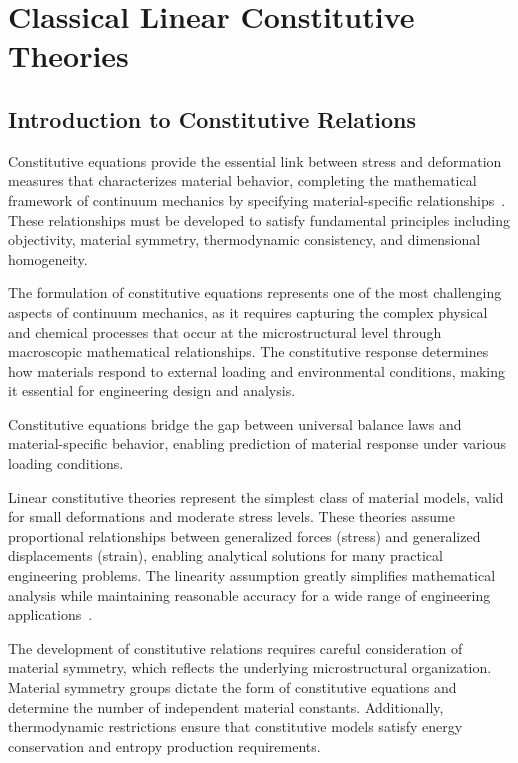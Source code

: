 \chapter{Classical Linear Constitutive Theories}

\section{Introduction to Constitutive Relations}

Constitutive equations provide the essential link between stress and deformation measures that characterizes material behavior, completing the mathematical framework of continuum mechanics by specifying material-specific relationships~\autocite{Sadd.2019}. These relationships must be developed to satisfy fundamental principles including objectivity, material symmetry, thermodynamic consistency, and dimensional homogeneity.

The formulation of constitutive equations represents one of the most challenging aspects of continuum mechanics, as it requires capturing the complex physical and chemical processes that occur at the microstructural level through macroscopic mathematical relationships. The constitutive response determines how materials respond to external loading and environmental conditions, making it essential for engineering design and analysis.

\begin{keypoint}
Constitutive equations bridge the gap between universal balance laws and material-specific behavior, enabling prediction of material response under various loading conditions.
\end{keypoint}

Linear constitutive theories represent the simplest class of material models, valid for small deformations and moderate stress levels. These theories assume proportional relationships between generalized forces (stress) and generalized displacements (strain), enabling analytical solutions for many practical engineering problems. The linearity assumption greatly simplifies mathematical analysis while maintaining reasonable accuracy for a wide range of engineering applications~\autocite{Sadd.2019}.

The development of constitutive relations requires careful consideration of material symmetry, which reflects the underlying microstructural organization. Material symmetry groups dictate the form of constitutive equations and determine the number of independent material constants. Additionally, thermodynamic restrictions ensure that constitutive models satisfy energy conservation and entropy production requirements.

